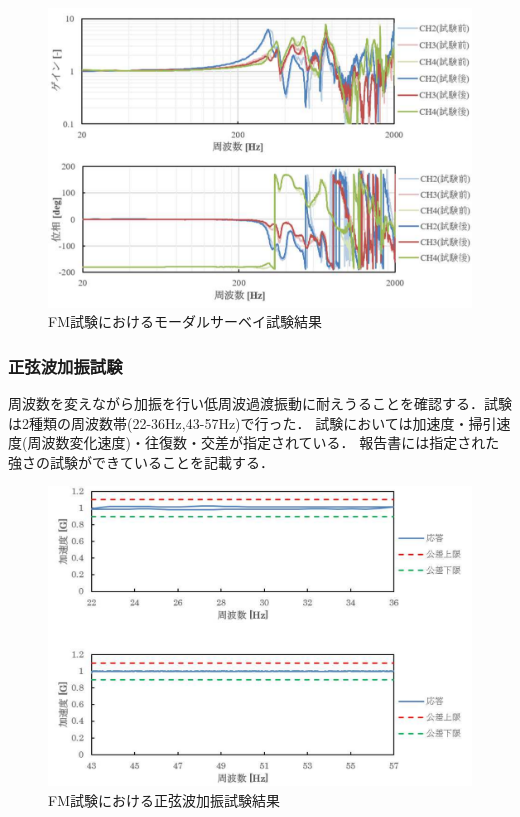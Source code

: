 \begin{figure}[H]
	\centering
	\includegraphics[width=1\linewidth]{04/fig/4-3-3.pdf}
	\caption{FM試験におけるモーダルサーベイ試験結果\cite{FM_vibration_test_report}}
	\label{fig4-3-1}
\end{figure}


\subsubsection{正弦波加振試験}
周波数を変えながら加振を行い低周波過渡振動に耐えうることを確認する．試験は2種類の周波数帯(22-36Hz,43-57Hz)で行った．
試験においては加速度・掃引速度(周波数変化速度)・往復数・交差が指定されている．
報告書には指定された強さの試験ができていることを記載する．

\begin{figure}[H]
	\centering
	\includegraphics[width=1\linewidth]{04/fig/4-3-4.pdf}
	\caption{FM試験における正弦波加振試験結果\cite{FM_vibration_test_report}}
	\label{fig4-3-1}
\end{figure}


